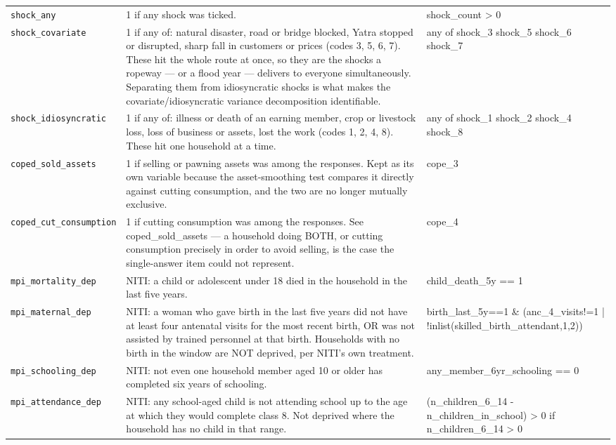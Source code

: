 \documentclass[10pt]{article}
\begin{document}
{\begin{longtable}{p{3.3cm}p{7.6cm}p{5.7cm}}
\texttt{shock\_any} & 1 if any shock was ticked. & shock\_count > 0 \\
\texttt{shock\_covariate} & 1 if any of: natural disaster, road or bridge blocked, Yatra stopped or disrupted, sharp fall in customers or prices (codes 3, 5, 6, 7). These hit the whole route at once, so they are the shocks a ropeway — or a flood year — delivers to everyone simultaneously. Separating them from idiosyncratic shocks is what makes the covariate/idiosyncratic variance decomposition identifiable. & any of shock\_3 shock\_5 shock\_6 shock\_7 \\
\texttt{shock\_idiosyncratic} & 1 if any of: illness or death of an earning member, crop or livestock loss, loss of business or assets, lost the work (codes 1, 2, 4, 8). These hit one household at a time. & any of shock\_1 shock\_2 shock\_4 shock\_8 \\
\texttt{coped\_sold\_assets} & 1 if selling or pawning assets was among the responses. Kept as its own variable because the asset-smoothing test compares it directly against cutting consumption, and the two are no longer mutually exclusive. & cope\_3 \\
\texttt{coped\_cut\_consumption} & 1 if cutting consumption was among the responses. See coped\_sold\_assets — a household doing BOTH, or cutting consumption precisely in order to avoid selling, is the case the single-answer item could not represent. & cope\_4 \\
\texttt{mpi\_mortality\_dep} & NITI: a child or adolescent under 18 died in the household in the last five years. & child\_death\_5y == 1 \\
\texttt{mpi\_maternal\_dep} & NITI: a woman who gave birth in the last five years did not have at least four antenatal visits for the most recent birth, OR was not assisted by trained personnel at that birth. Households with no birth in the window are NOT deprived, per NITI's own treatment. & birth\_last\_5y==1 \& (anc\_4\_visits!=1 | !inlist(skilled\_birth\_attendant,1,2)) \\
\texttt{mpi\_schooling\_dep} & NITI: not even one household member aged 10 or older has completed six years of schooling. & any\_member\_6yr\_schooling == 0 \\
\texttt{mpi\_attendance\_dep} & NITI: any school-aged child is not attending school up to the age at which they would complete class 8. Not deprived where the household has no child in that range. & (n\_children\_6\_14 - n\_children\_in\_school) > 0 if n\_children\_6\_14 > 0 \\

\end{longtable}}
\end{document}
